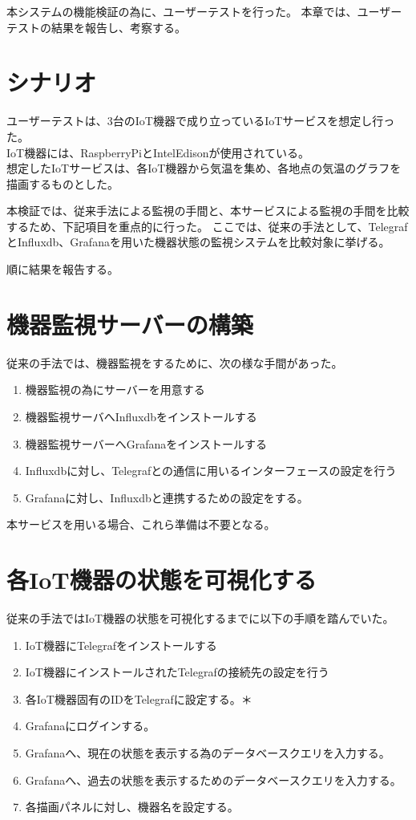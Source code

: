 本システムの機能検証の為に、ユーザーテストを行った。
本章では、ユーザーテストの結果を報告し、考察する。

\section{シナリオ}
ユーザーテストは、3台のIoT機器で成り立っているIoTサービスを想定し行った。\\
IoT機器には、RaspberryPiとIntelEdisonが使用されている。\\
想定したIoTサービスは、各IoT機器から気温を集め、各地点の気温のグラフを描画するものとした。

本検証では、従来手法による監視の手間と、本サービスによる監視の手間を比較するため、下記項目を重点的に行った。
ここでは、従来の手法として、TelegrafとInfluxdb、Grafanaを用いた機器状態の監視システムを比較対象に挙げる。

順に結果を報告する。
\section{機器監視サーバーの構築}
従来の手法では、機器監視をするために、次の様な手間があった。
\begin{enumerate}
\item 機器監視の為にサーバーを用意する
\item 機器監視サーバへInfluxdbをインストールする
\item 機器監視サーバーへGrafanaをインストールする
\item Influxdbに対し、Telegrafとの通信に用いるインターフェースの設定を行う
\item Grafanaに対し、Influxdbと連携するための設定をする。
\end{enumerate}

本サービスを用いる場合、これら準備は不要となる。

\section{各IoT機器の状態を可視化する}
従来の手法ではIoT機器の状態を可視化するまでに以下の手順を踏んでいた。
\begin{enumerate}
\item IoT機器にTelegrafをインストールする
\item IoT機器にインストールされたTelegrafの接続先の設定を行う
\item 各IoT機器固有のIDをTelegrafに設定する。＊
\item Grafanaにログインする。
\item Grafanaへ、現在の状態を表示する為のデータベースクエリを入力する。
\item Grafanaへ、過去の状態を表示するためのデータベースクエリを入力する。
\item 各描画パネルに対し、機器名を設定する。
\end{enumerate}

